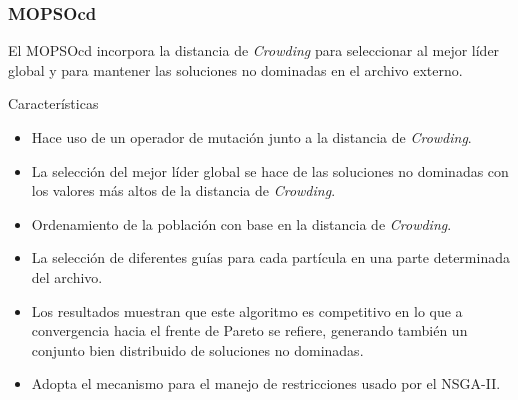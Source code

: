 \documentclass[10pt,compress]{beamer}
\begin{document}
\begin{frame}
	\frametitle{MOPSOcd}
	El MOPSOcd incorpora la distancia de \textit{Crowding} para seleccionar al mejor l\'ider global y para mantener las soluciones no dominadas 
  en el archivo externo.
	\begin{block}{Caracter\'isticas}
		\begin{itemize}
			\item Hace uso de un operador de mutaci\'on junto a la distancia de \textit{Crowding}.  
			\item La selecci\'on del mejor l\'ider global se hace de las soluciones no dominadas con los valores m\'as altos de la distancia de \textit{Crowding}. 
			\item Ordenamiento de la poblaci\'on con base en la distancia de \textit{Crowding}.
			\item La selecci\'on de diferentes gu\'ias para cada part\'icula en una parte determinada del archivo.
			\item Los resultados muestran que este algoritmo es competitivo en lo que a 
					convergencia hacia el frente de Pareto se refiere, generando tambi\'en un conjunto bien distribuido de soluciones no dominadas. 
			\item Adopta el mecanismo para el manejo de restricciones usado por el NSGA-II.
  \end{itemize}  
 
	\end{block}
\end{frame}
\end{document}
